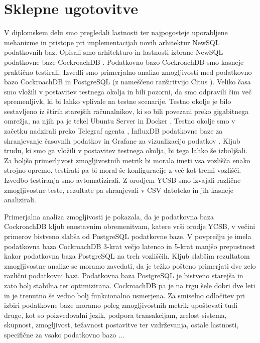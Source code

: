 \documentclass[a4paper, 12pt]{book}
\begin{document}
\chapter{Sklepne ugotovitve}

V diplomskem delu smo pregledali lastnosti  ter najpogosteje uporabljene mehanizme in pristope pri implementacijah novih arhitektur NewSQL podatkovnih baz. Opisali smo arhitekturo in lastnosti izbrane NewSQL podatkovne baze CockroachDB \cite{CRDB-home}. Podatkovno bazo CockroachDB smo kasneje praktično testirali. Izvedli smo primerjalno analizo zmogljivosti med podatkovno bazo CockroachDB in PostgreSQL \cite{postgres} (z nameščeno razširitvijo Citus \cite{citus}). Veliko časa smo vložili v postavitev testnega okolja in bili pozorni, da smo odpravili čim več spremenljivk, ki bi lahko vplivale na testne scenarije. Testno okolje je bilo sestavljeno iz štirih starejših računalnikov, ki so bili povezani preko gigabitnega omrežja, na njih pa je tekel Ubuntu Server \cite{ubuntu-server} in Docker \cite{docker}. Testno okolje smo v začetku nadzirali preko Telegraf agenta \cite{telegraf}, InfluxDB podatkovne baze za shranjevanje časovnih podatkov \cite{influxdb} in Grafane za vizualizacijo podatkov \cite{grafana}. Kljub trudu, ki smo ga vložili v postavitev testnega okolja, bi tega lahko še izboljšali. Za boljšo primerljivost zmogljivostnih metrik bi morala imeti vsa vozlišča enako strojno opremo, testirati pa bi moral še konfiguracije z več kot tremi vozlišči. Izvedbo testiranja smo avtomatizirali. Z orodjem YCSB \cite{brianfrankcooper/YCSB} smo izvajali različne zmogljivostne teste, rezultate pa shranjevali v CSV datoteko in jih kasneje analizirali.

Primerjalna analiza zmogljivosti je pokazala, da je podatkovna baza Cock\-roachDB kljub enostavnim obremenitvam, katere vrši orodje YCSB, v večini primerov bistveno slabša od PostgreSQL podatkovne baze. V povprečju je imela podatkovna baza Cock\-roachDB 3-krat večjo latenco in 5-krat manjšo prepustnost kakor podatkovna baza PostgreSQL na treh vozliščih.
Kljub slabšim rezultatom zmogljivostne analize se moramo zavedati, da je težko pošteno primerjati dve zelo različni podatkovni bazi. Podatkovna baza PostgreSQL je bistveno starejša in zato bolj stabilna ter optimizirana. CockroachDB pa je na trgu šele dobri dve leti in je trenutno še vedno bolj funkcionalno usmerjena. Za smiselno odločitev pri izbiri podatkovne baze moramo poleg zmogljivostnih metrik upoštevati tudi druge, kot so poizvedovalni jezik, podpora transakcijam, zrelost sistema, skupnost, zmogljivost, težavnost postavitve ter vzdrževanja, ostale lastnosti, specifične za vsako podatkovno bazo ...
\end{document}
